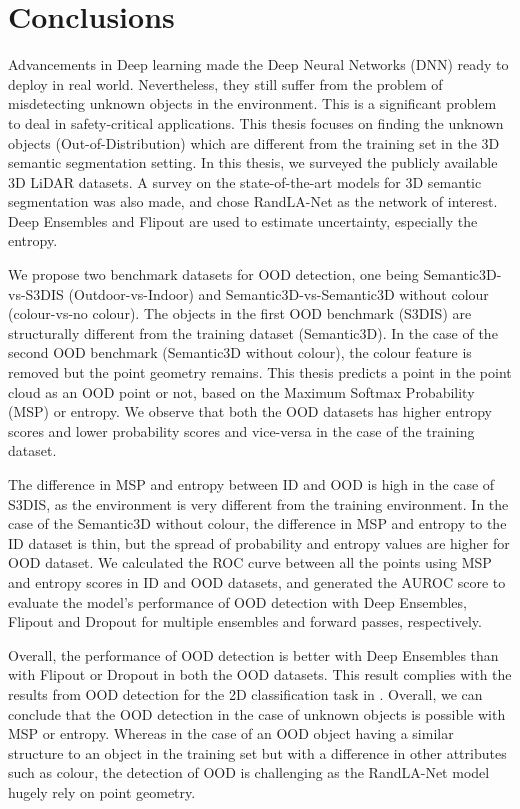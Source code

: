 

    \chapter{Conclusions}
    Advancements in Deep learning made the Deep Neural Networks (DNN) ready to deploy in real world.
    Nevertheless, they still suffer from the problem of misdetecting unknown objects in the environment.
    This is a significant problem to deal in safety-critical applications.
    This thesis focuses on finding the unknown objects (Out-of-Distribution) which are different from the training set in the 3D semantic segmentation setting.
    In this thesis, we surveyed the publicly available 3D LiDAR datasets.
    A survey on the state-of-the-art models for 3D semantic segmentation was also made, and chose RandLA-Net as the network of interest.
    Deep Ensembles and Flipout are used to estimate uncertainty, especially the entropy. 
    
    We propose two benchmark datasets for OOD detection, one being Semantic3D-vs-S3DIS (Outdoor-vs-Indoor) and Semantic3D-vs-Semantic3D without colour (colour-vs-no colour).
    The objects in the first OOD benchmark (S3DIS) are structurally different from the training dataset (Semantic3D).
    In the case of the second OOD benchmark (Semantic3D without colour), the colour feature is removed but the point geometry remains.
    This thesis predicts a point in the point cloud as an OOD point or not, based on the Maximum Softmax Probability (MSP) or entropy.
    We observe that both the OOD datasets has higher entropy scores and lower probability scores and vice-versa in the case of the training dataset.
    
    The difference in MSP and entropy between ID and OOD is high in the case of S3DIS, as the environment is very different from the training environment.
    In the case of the Semantic3D without colour, the difference in MSP and entropy to the ID dataset is thin, but the spread of probability and entropy values are higher for OOD dataset.
    We calculated the ROC curve between all the points using MSP and entropy scores in ID and OOD datasets, and generated the AUROC score to evaluate the model's performance of OOD detection with Deep Ensembles, Flipout and Dropout for multiple ensembles and forward passes, respectively.
    
    Overall, the performance of OOD detection is better with Deep Ensembles than with Flipout or Dropout in both the OOD datasets.
    This result complies with the results from OOD detection for the 2D classification task in \cite{lakshminarayanan2016simple}.
    Overall, we can conclude that the OOD detection in the case of unknown objects is possible with MSP or entropy.
    Whereas in the case of an OOD object having a similar structure to an object in the training set but with a difference in other attributes such as colour, the detection of OOD is challenging as the RandLA-Net model hugely rely on point geometry.
    

